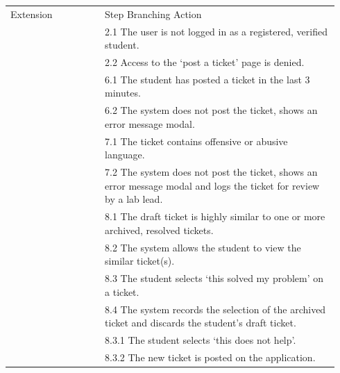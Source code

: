 \begin{table}[H]
\begin{tabular}{p{0.27\linewidth}  p{0.67\linewidth}}
 Extension & Step\hspace{0.3cm} Branching Action \\
 & 2.1 \hspace{0.5cm}The user is not logged in as a registered, verified student. \\
 & 2.2 \hspace{0.5cm}Access to the `post a ticket' page is denied. \\
 & 6.1 \hspace{0.5cm}The student has posted a ticket in the last 3 minutes. \\
 & 6.2 \hspace{0.5cm}The system does not post the ticket, shows an error message modal. \\
 & 7.1 \hspace{0.5cm} The ticket contains offensive or abusive language.\\
 & 7.2 \hspace{0.5cm} The system does not post the ticket, shows an error message modal and logs the ticket for review by a lab lead.\\
 & 8.1 \hspace{0.5cm} The draft ticket is highly similar to one or more archived, resolved tickets.\\
 & 8.2 \hspace{0.5cm} The system allows the student to view the similar ticket(s).\\
 & 8.3 \hspace{0.5cm} The student selects `this solved my problem' on a ticket.\\
 & 8.4 \hspace{0.5cm} The system records the selection of the archived ticket and discards the student's draft ticket.\\
 & 8.3.1 \hspace{0.5cm} The student selects `this does not help'.\\
 & 8.3.2 \hspace{0.5cm} The new ticket is posted on the application.\\
 
\end{tabular}
\end{table}

\newpage
